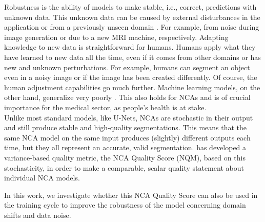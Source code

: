 Robustness is the ability of models to make stable, i.e., correct, predictions with unknown data. This unknown data can be caused by external disturbances in the application or from a previously unseen domain \cite{Zhou:2023:DomainGeneralization_alsoAugmentation}. For example, from noise during image generation or due to a new MRI machine, respectively.
Adapting knowledge to new data is straightforward for humans. Humans apply what they have learned to new data all the time, even if it comes from other domains or has new and unknown perturbations. For example, humans can segment an object even in a noisy image or if the image has been created differently. Of course, the human adjustment capabilities go much further. Machine learning models, on the other hand, generalize very poorly \cite{Zhou:2023:DomainGeneralization_alsoAugmentation}. This also holds for NCAs and is of crucial importance for the medical sector, as people's health is at stake.\\
Unlike most standard models, like U-Nets, NCAs are stochastic in their output and still produce stable and high-quality segmentations. This means that the same NCA model on the same input produces (slightly) different outputs each time, but they all represent an accurate, valid segmentation.
\cite{kalkhof:2023:M3D-NCA} has developed a variance-based quality metric, the NCA Quality Score (NQM), based on this stochasticity, in order to make a comparable, scalar quality statement about individual NCA models.

In this work, we investigate whether this NCA Quality Score can also be used in the training cycle to improve the robustness of the model concerning domain shifts and data noise. 

